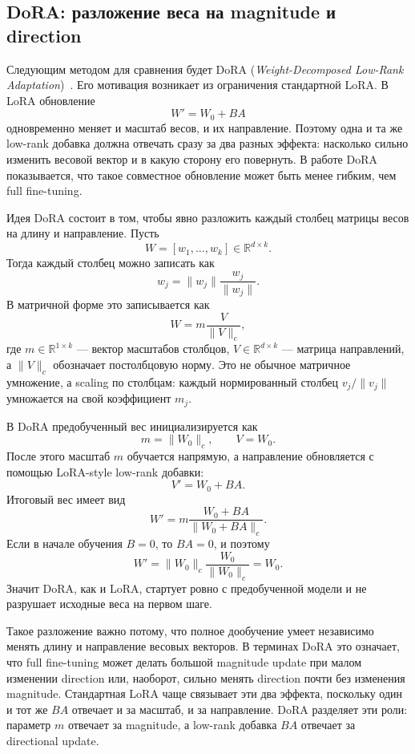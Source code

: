 \documentclass[]{scrartcl}
\begin{document}
\subsection{DoRA: разложение веса на magnitude и direction}

Следующим методом для сравнения будет DoRA (\textit{Weight-Decomposed Low-Rank
Adaptation})~\cite{liu2024dora}. Его мотивация возникает из ограничения стандартной LoRA. В LoRA
обновление
\[
    W' = W_0 + BA
\]
одновременно меняет и масштаб весов, и их направление. Поэтому одна и та же
low-rank добавка должна отвечать сразу за два разных эффекта: насколько сильно
изменить весовой вектор и в какую сторону его повернуть. В работе DoRA
показывается, что такое совместное обновление может быть менее гибким, чем full
fine-tuning.

Идея DoRA состоит в том, чтобы явно разложить каждый столбец матрицы весов на
длину и направление. Пусть
\[
    W = [w_1,\ldots,w_k] \in \mathbb{R}^{d \times k}.
\]
Тогда каждый столбец можно записать как
\[
    w_j = \|w_j\| \frac{w_j}{\|w_j\|}.
\]
В матричной форме это записывается как
\[
    W = m \frac{V}{\|V\|_c},
\]
где $m \in \mathbb{R}^{1 \times k}$ --- вектор масштабов столбцов, $V \in
\mathbb{R}^{d \times k}$ --- матрица направлений, а $\|V\|_c$ обозначает
постолбцовую норму. Это не обычное матричное умножение, а scaling по столбцам:
каждый нормированный столбец $v_j / \|v_j\|$ умножается на свой коэффициент
$m_j$.

В DoRA предобученный вес инициализируется как
\[
    m = \|W_0\|_c, \qquad V = W_0.
\]
После этого масштаб $m$ обучается напрямую, а направление обновляется с помощью
LoRA-style low-rank добавки:
\[
    V' = W_0 + BA.
\]
Итоговый вес имеет вид
\[
    W'
    =
    m \frac{W_0 + BA}{\|W_0 + BA\|_c}.
\]
Если в начале обучения $B=0$, то $BA=0$, и поэтому
\[
    W' = \|W_0\|_c \frac{W_0}{\|W_0\|_c} = W_0.
\]
Значит DoRA, как и LoRA, стартует ровно с предобученной модели и не разрушает
исходные веса на первом шаге.

Такое разложение важно потому, что полное дообучение умеет независимо менять
длину и направление весовых векторов. В терминах DoRA это означает, что full
fine-tuning может делать большой magnitude update при малом изменении direction
или, наоборот, сильно менять direction почти без изменения magnitude. Стандартная
LoRA чаще связывает эти два эффекта, поскольку один и тот же $BA$ отвечает и за
масштаб, и за направление. DoRA разделяет эти роли: параметр $m$ отвечает за
magnitude, а low-rank добавка $BA$ отвечает за directional update.
\end{document}
